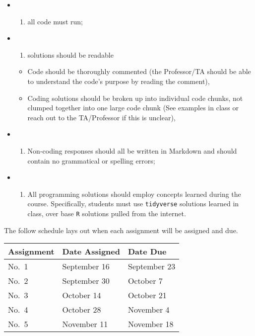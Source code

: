 \documentclass[
  12pt,
]{article}
\providecommand{\tightlist}{%
  \setlength{\itemsep}{0pt}\setlength{\parskip}{0pt}}
\begin{document}
\begin{itemize}
\item
  \begin{enumerate}
  \def\labelenumi{(\roman{enumi})}
  \tightlist
  \item
    all code must run;
  \end{enumerate}
\item
  \begin{enumerate}
  \def\labelenumi{(\roman{enumi})}
  \setcounter{enumi}{1}
  \tightlist
  \item
    solutions should be readable
  \end{enumerate}

  \begin{itemize}
  \tightlist
  \item
    Code should be thoroughly commented (the Professor/TA should be able
    to understand the code's purpose by reading the comment),
  \item
    Coding solutions should be broken up into individual code chunks,
    not clumped together into one large code chunk (See examples in
    class or reach out to the TA/Professor if this is unclear),
  \end{itemize}
\item
  \begin{enumerate}
  \def\labelenumi{(\roman{enumi})}
  \setcounter{enumi}{2}
  \tightlist
  \item
    Non-coding responses should all be written in Markdown and should
    contain no grammatical or spelling errors;
  \end{enumerate}
\item
  \begin{enumerate}
  \def\labelenumi{(\roman{enumi})}
  \setcounter{enumi}{3}
  \tightlist
  \item
    All programming solutions should employ concepts learned during the
    course. Specifically, students must use \texttt{tidyverse} solutions
    learned in class, over base \texttt{R} solutions pulled from the
    internet.
  \end{enumerate}
\end{itemize}

The follow schedule lays out when each assignment will be assigned and
due.

\begin{longtable}[]{@{}lll@{}}
\toprule
Assignment & Date Assigned & Date Due\tabularnewline
\midrule
\endhead
No.~1 & September 16 & September 23\tabularnewline
No.~2 & September 30 & October 7\tabularnewline
No.~3 & October 14 & October 21\tabularnewline
No.~4 & October 28 & November 4\tabularnewline
No.~5 & November 11 & November 18\tabularnewline
\bottomrule
\end{longtable}
\end{document}
